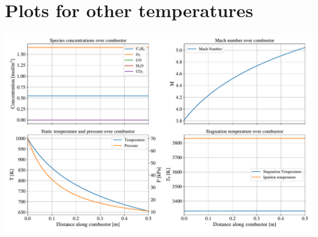\documentclass[a4paper]{article}
\begin{document}
\section{Plots for other temperatures}\label{app:other_plots}
\begin{widefigure}[20mm]
    \centering
    \includegraphics[width=\linewidth]{part_2_img/subfig_1000.pdf}
    \caption{Properties over combustion at \SI{1000}{\K}}
    \label{fig:properties_1000}
\end{widefigure}
\end{document}
